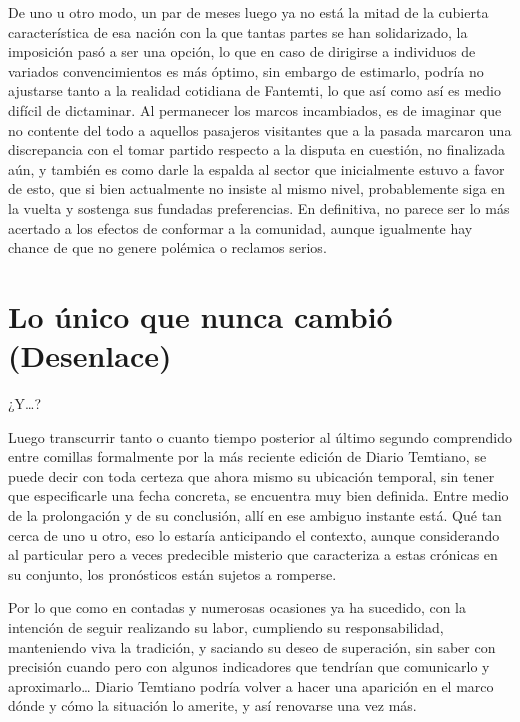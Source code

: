 \documentclass[
]{book}
\begin{document}
De uno u otro modo, un par de meses luego ya no está la mitad de la cubierta característica de esa nación con la que tantas partes se han solidarizado, la imposición pasó a ser una opción, lo que en caso de dirigirse a individuos de variados convencimientos es más óptimo, sin embargo de estimarlo, podría no ajustarse tanto a la realidad cotidiana de Fantemti, lo que así como así es medio difícil de dictaminar. Al permanecer los marcos incambiados, es de imaginar que no contente del todo a aquellos pasajeros visitantes que a la pasada marcaron una discrepancia con el tomar partido respecto a la disputa en cuestión, no finalizada aún, y también es como darle la espalda al sector que inicialmente estuvo a favor de esto, que si bien actualmente no insiste al mismo nivel, probablemente siga en la vuelta y sostenga sus fundadas preferencias. En definitiva, no parece ser lo más acertado a los efectos de conformar a la comunidad, aunque igualmente hay chance de que no genere polémica o reclamos serios.

\hypertarget{lo-uxfanico-que-nunca-cambiuxf3-desenlace}{%
\chapter{Lo único que nunca cambió (Desenlace)}\label{lo-uxfanico-que-nunca-cambiuxf3-desenlace}}

¿Y\ldots?

Luego transcurrir tanto o cuanto tiempo posterior al último segundo comprendido entre comillas formalmente por la más reciente edición de Diario Temtiano, se puede decir con toda certeza que ahora mismo su ubicación temporal, sin tener que especificarle una fecha concreta, se encuentra muy bien definida. Entre medio de la prolongación y de su conclusión, allí en ese ambiguo instante está. Qué tan cerca de uno u otro, eso lo estaría anticipando el contexto, aunque considerando al particular pero a veces predecible misterio que caracteriza a estas crónicas en su conjunto, los pronósticos están sujetos a romperse.

Por lo que como en contadas y numerosas ocasiones ya ha sucedido, con la intención de seguir realizando su labor, cumpliendo su responsabilidad, manteniendo viva la tradición, y saciando su deseo de superación, sin saber con precisión cuando pero con algunos indicadores que tendrían que comunicarlo y aproximarlo\ldots{} Diario Temtiano podría volver a hacer una aparición en el marco dónde y cómo la situación lo amerite, y así renovarse una vez más.
\end{document}
